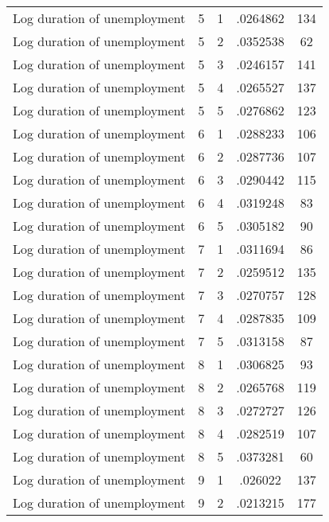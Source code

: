 \begin{tabular}{l*{4}{c}}
Log duration of unemployment&           5&           1&    .0264862&         134\\
Log duration of unemployment&           5&           2&    .0352538&          62\\
Log duration of unemployment&           5&           3&    .0246157&         141\\
Log duration of unemployment&           5&           4&    .0265527&         137\\
Log duration of unemployment&           5&           5&    .0276862&         123\\
Log duration of unemployment&           6&           1&    .0288233&         106\\
Log duration of unemployment&           6&           2&    .0287736&         107\\
Log duration of unemployment&           6&           3&    .0290442&         115\\
Log duration of unemployment&           6&           4&    .0319248&          83\\
Log duration of unemployment&           6&           5&    .0305182&          90\\
Log duration of unemployment&           7&           1&    .0311694&          86\\
Log duration of unemployment&           7&           2&    .0259512&         135\\
Log duration of unemployment&           7&           3&    .0270757&         128\\
Log duration of unemployment&           7&           4&    .0287835&         109\\
Log duration of unemployment&           7&           5&    .0313158&          87\\
Log duration of unemployment&           8&           1&    .0306825&          93\\
Log duration of unemployment&           8&           2&    .0265768&         119\\
Log duration of unemployment&           8&           3&    .0272727&         126\\
Log duration of unemployment&           8&           4&    .0282519&         107\\
Log duration of unemployment&           8&           5&    .0373281&          60\\
Log duration of unemployment&           9&           1&     .026022&         137\\
Log duration of unemployment&           9&           2&    .0213215&         177\\

\end{tabular}
